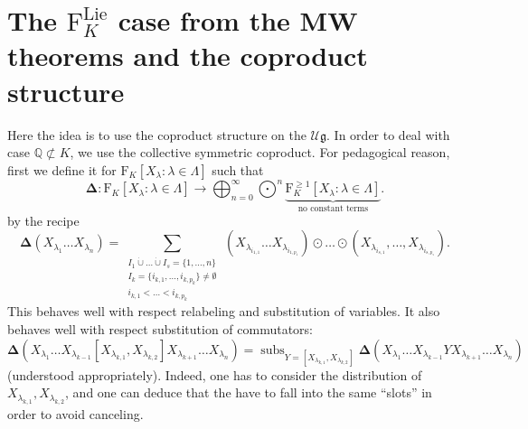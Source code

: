 \documentclass[11pt,a4paper]{amsart}
\newcommand{\plabel}[1]{ \label{#1}}
\newcommand{\plabel}[1]{ \label{#1}\rlap{\smash{${}^{^{[#1]}}$}}}
\newcommand{\plabel}[1]{ \label{#1}}
\DeclareMathOperator*{\subs}{subs}
\DeclareMathOperator{\Lie}{Lie}
\newcommand{\bo}{\boldsymbol}
\theoremstyle{definition}
\theoremstyle{plain}
\begin{document}
\section{The $\mathrm F_{K}^{\Lie}$ case from the MW theorems and the coproduct structure}\plabel{sec:freeMW}
Here the idea is to use the coproduct structure on the $\mathcal U\mathfrak g$.
In order to deal with case $\mathbb Q \not\subset K$, we use the collective symmetric coproduct.
For pedagogical reason, first we define it for $\mathrm F_{K}[X_\lambda:\lambda\in\Lambda]$ such that
\[\bo\Delta:\mathrm F_{K}[X_\lambda:\lambda\in\Lambda]\rightarrow\bigoplus_{n=0}^\infty\textstyle{\bigodot^n}
\underbrace{\mathrm F_{K}^{\geq 1}[X_\lambda:\lambda\in\Lambda]}_{\text{no constant terms}}.\]
 by the recipe
\[\bo\Delta
 (X_{\lambda_1} \ldots X_{\lambda_n})=\sum_{\substack{I_1\dot\cup\ldots \dot\cup I_s=\{1,\ldots,n\}\\I_k=\{i_{k,1},\ldots,i_{k,p_k}\}\neq
\emptyset \\i_{k,1}<\ldots<i_{k,p_k}}} \,
  (X_{\lambda_{i_{1,1}}}\ldots X_{\lambda_{i_{1,p_1}}})\odot\ldots\odot
  (X_{\lambda_{i_{s,1}}},\ldots ,X_{\lambda_{i_{s,p_s}}}).
\]
This behaves well with respect relabeling and substitution of variables.
It also behaves well  with respect substitution of commutators:
\[\bo\Delta(X_{\lambda_1} \ldots X_{\lambda_{k-1}}[X_{\lambda_{k,1}},X_{\lambda_{k,2}} ] X_{\lambda_{k+1}} \ldots X_{\lambda_n})
=\subs_{Y=[X_{\lambda_{k,1}},X_{\lambda_{k,2}} ]}
\bo\Delta(X_{\lambda_1} \ldots X_{\lambda_{k-1}}Y X_{\lambda_{k+1}} \ldots X_{\lambda_n}) \]
 (understood appropriately).
Indeed, one has to consider the distribution of $X_{\lambda_{k,1}},X_{\lambda_{k,2}}$,
 and one can deduce that the have to fall into the same ``slots'' in order to avoid canceling.
\end{document}
